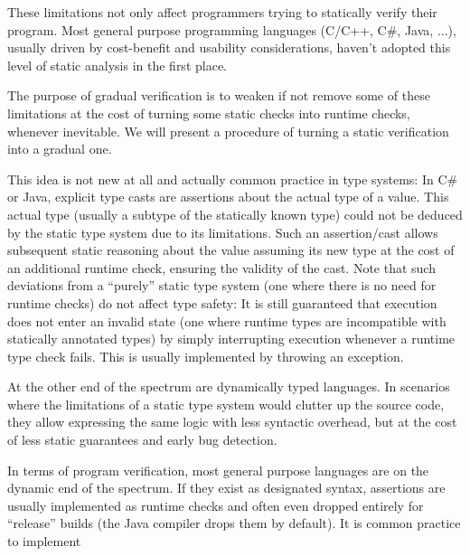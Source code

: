 These limitations not only affect programmers trying to statically verify their program.
Most general purpose programming languages (C/C++, C\#, Java, ...), usually driven by cost-benefit and usability considerations, haven't adopted this level of static analysis in the first place.

The purpose of gradual verification is to weaken if not remove some of these limitations at the cost of turning some static checks into runtime checks, whenever inevitable.
We will present a procedure of turning a static verification into a gradual one.

This idea is not new at all and actually common practice in type systems:
In C\# or Java, explicit type casts are assertions about the actual type of a value.
This actual type (usually a subtype of the statically known type) could not be deduced by the static type system due to its limitations.
Such an assertion/cast allows subsequent static reasoning about the value assuming its new type at the cost of an additional runtime check, ensuring the validity of the cast.
Note that such deviations from a “purely” static type system (one where there is no need for runtime checks) do not affect type safety:
It is still guaranteed that execution does not enter an invalid state (one where runtime types are incompatible with statically annotated types) by simply interrupting execution whenever a runtime type check fails.
This is usually implemented by throwing an exception.


At the other end of the spectrum are dynamically typed languages.
In scenarios where the limitations of a static type system would clutter up the source code, they allow expressing the same logic with less syntactic overhead, but at the cost of less static guarantees and early bug detection.

In terms of program verification, most general purpose languages are on the dynamic end of the spectrum.
If they exist as designated syntax, assertions are usually implemented as runtime checks and often even dropped entirely for “release” builds (the Java compiler drops them by default).
It is common practice to implement 

%    


